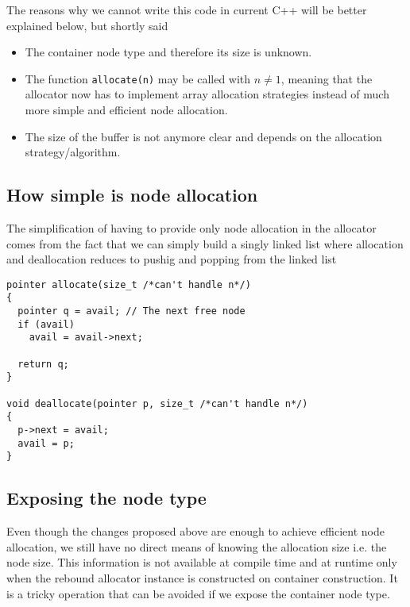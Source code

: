 \documentclass[11pt]{article}
\begin{document}
The reasons why we cannot write this code in current C++ will
be better explained below, but shortly said

\begin{itemize}

\item The container node type and therefore its size is unknown.

\item The function \texttt{allocate(n)} may be called with $n \ne 1$,
meaning that the allocator now has to implement array allocation strategies
instead of much more simple and efficient node allocation.

\item The size of the buffer is not anymore clear and depends
on the allocation strategy/algorithm.
\end{itemize}

\subsection{How simple is node allocation}
The simplification
of having to provide only node allocation in the allocator
comes from the fact that  we can simply build a singly linked list
where allocation and deallocation reduces to pushig and
popping from the linked list

\medskip
\begin{lstlisting}
pointer allocate(size_t /*can't handle n*/)
{
  pointer q = avail; // The next free node
  if (avail)
    avail = avail->next;

  return q;
}

void deallocate(pointer p, size_t /*can't handle n*/)
{
  p->next = avail;
  avail = p;
}

\end{lstlisting}

\subsection{Exposing the node type}

Even though the changes proposed above are enough to achieve efficient
node allocation, we still have no direct means of knowing the
allocation size i.e. the node size. This information is not available
at compile time and at runtime only when the rebound allocator
instance is constructed on container construction. It is a tricky
operation that can be avoided if we expose the container node type.
\end{document}
